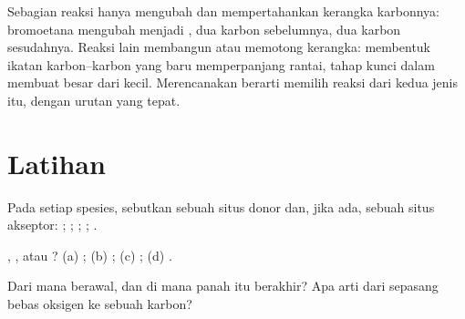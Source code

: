 \begin{remark}\label{rem:g12:curly-arrows:skeleton}
Sebagian reaksi hanya mengubah  dan mempertahankan kerangka
karbonnya:  bromoetana mengubah  menjadi ,
dua karbon sebelumnya, dua karbon sesudahnya. Reaksi lain membangun atau
memotong kerangka: membentuk ikatan karbon--karbon yang baru
memperpanjang rantai, tahap kunci dalam membuat  besar dari
 kecil. Merencanakan  berarti memilih reaksi dari
kedua jenis itu, dengan urutan yang tepat.
\end{remark}

\section{Latihan}

\begin{exercise}[$\star$]\label{exo:g12:curly-arrows:1}
Pada setiap spesies, sebutkan sebuah situs donor dan, jika ada, sebuah
situs akseptor: ; ; ; ; .
\end{exercise}

\begin{exercise}[$\star$]\label{exo:g12:curly-arrows:2}
, , atau ?
(a) ;
(b) ;
(c) ;
(d) .
\end{exercise}

\begin{exercise}[$\star$]\label{exo:g12:curly-arrows:3}
Dari mana  berawal, dan di mana panah itu berakhir? Apa
arti  dari sepasang  bebas  oksigen ke sebuah
 karbon?
\end{exercise}

